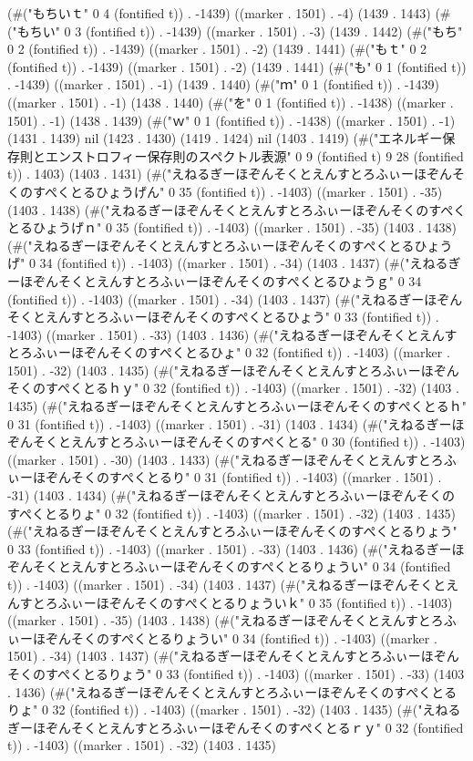 (#("もちいｔ" 0 4 (fontified t)) . -1439) ((marker . 1501) . -4) (1439 . 1443) (#("もちい" 0 3 (fontified t)) . -1439) ((marker . 1501) . -3) (1439 . 1442) (#("もち" 0 2 (fontified t)) . -1439) ((marker . 1501) . -2) (1439 . 1441) (#("もｔ" 0 2 (fontified t)) . -1439) ((marker . 1501) . -2) (1439 . 1441) (#("も" 0 1 (fontified t)) . -1439) ((marker . 1501) . -1) (1439 . 1440) (#("ｍ" 0 1 (fontified t)) . -1439) ((marker . 1501) . -1) (1438 . 1440) (#("を" 0 1 (fontified t)) . -1438) ((marker . 1501) . -1) (1438 . 1439) (#("ｗ" 0 1 (fontified t)) . -1438) ((marker . 1501) . -1) (1431 . 1439) nil (1423 . 1430) (1419 . 1424) nil (1403 . 1419) (#("エネルギー保存則とエンストロフィー保存則のスペクトル表源" 0 9 (fontified t) 9 28 (fontified t)) . 1403) (1403 . 1431) (#("えねるぎーほぞんそくとえんすとろふぃーほぞんそくのすぺくとるひょうげん" 0 35 (fontified t)) . -1403) ((marker . 1501) . -35) (1403 . 1438) (#("えねるぎーほぞんそくとえんすとろふぃーほぞんそくのすぺくとるひょうげｎ" 0 35 (fontified t)) . -1403) ((marker . 1501) . -35) (1403 . 1438) (#("えねるぎーほぞんそくとえんすとろふぃーほぞんそくのすぺくとるひょうげ" 0 34 (fontified t)) . -1403) ((marker . 1501) . -34) (1403 . 1437) (#("えねるぎーほぞんそくとえんすとろふぃーほぞんそくのすぺくとるひょうｇ" 0 34 (fontified t)) . -1403) ((marker . 1501) . -34) (1403 . 1437) (#("えねるぎーほぞんそくとえんすとろふぃーほぞんそくのすぺくとるひょう" 0 33 (fontified t)) . -1403) ((marker . 1501) . -33) (1403 . 1436) (#("えねるぎーほぞんそくとえんすとろふぃーほぞんそくのすぺくとるひょ" 0 32 (fontified t)) . -1403) ((marker . 1501) . -32) (1403 . 1435) (#("えねるぎーほぞんそくとえんすとろふぃーほぞんそくのすぺくとるｈｙ" 0 32 (fontified t)) . -1403) ((marker . 1501) . -32) (1403 . 1435) (#("えねるぎーほぞんそくとえんすとろふぃーほぞんそくのすぺくとるｈ" 0 31 (fontified t)) . -1403) ((marker . 1501) . -31) (1403 . 1434) (#("えねるぎーほぞんそくとえんすとろふぃーほぞんそくのすぺくとる" 0 30 (fontified t)) . -1403) ((marker . 1501) . -30) (1403 . 1433) (#("えねるぎーほぞんそくとえんすとろふぃーほぞんそくのすぺくとるり" 0 31 (fontified t)) . -1403) ((marker . 1501) . -31) (1403 . 1434) (#("えねるぎーほぞんそくとえんすとろふぃーほぞんそくのすぺくとるりょ" 0 32 (fontified t)) . -1403) ((marker . 1501) . -32) (1403 . 1435) (#("えねるぎーほぞんそくとえんすとろふぃーほぞんそくのすぺくとるりょう" 0 33 (fontified t)) . -1403) ((marker . 1501) . -33) (1403 . 1436) (#("えねるぎーほぞんそくとえんすとろふぃーほぞんそくのすぺくとるりょうい" 0 34 (fontified t)) . -1403) ((marker . 1501) . -34) (1403 . 1437) (#("えねるぎーほぞんそくとえんすとろふぃーほぞんそくのすぺくとるりょういｋ" 0 35 (fontified t)) . -1403) ((marker . 1501) . -35) (1403 . 1438) (#("えねるぎーほぞんそくとえんすとろふぃーほぞんそくのすぺくとるりょうい" 0 34 (fontified t)) . -1403) ((marker . 1501) . -34) (1403 . 1437) (#("えねるぎーほぞんそくとえんすとろふぃーほぞんそくのすぺくとるりょう" 0 33 (fontified t)) . -1403) ((marker . 1501) . -33) (1403 . 1436) (#("えねるぎーほぞんそくとえんすとろふぃーほぞんそくのすぺくとるりょ" 0 32 (fontified t)) . -1403) ((marker . 1501) . -32) (1403 . 1435) (#("えねるぎーほぞんそくとえんすとろふぃーほぞんそくのすぺくとるｒｙ" 0 32 (fontified t)) . -1403) ((marker . 1501) . -32) (1403 . 1435) 